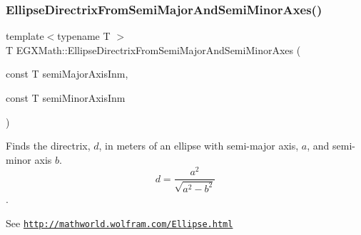 \subsubsection{\texorpdfstring{Ellipse\+Directrix\+From\+Semi\+Major\+And\+Semi\+Minor\+Axes()}{EllipseDirectrixFromSemiMajorAndSemiMinorAxes()}}
{\footnotesize\ttfamily template$<$typename T $>$ \\
T E\+G\+X\+Math\+::\+Ellipse\+Directrix\+From\+Semi\+Major\+And\+Semi\+Minor\+Axes (\begin{DoxyParamCaption}\item[{const T}]{semi\+Major\+Axis\+Inm,  }\item[{const T}]{semi\+Minor\+Axis\+Inm }\end{DoxyParamCaption})}



Finds the directrix, $d$, in meters of an ellipse with semi-\/major axis, $a$, and semi-\/minor axis $b$. \[ d=\frac{a^2}{\sqrt{a^2-b^2}} \]. 

See \href{http://mathworld.wolfram.com/Ellipse.html}{\tt http\+://mathworld.\+wolfram.\+com/\+Ellipse.\+html}


